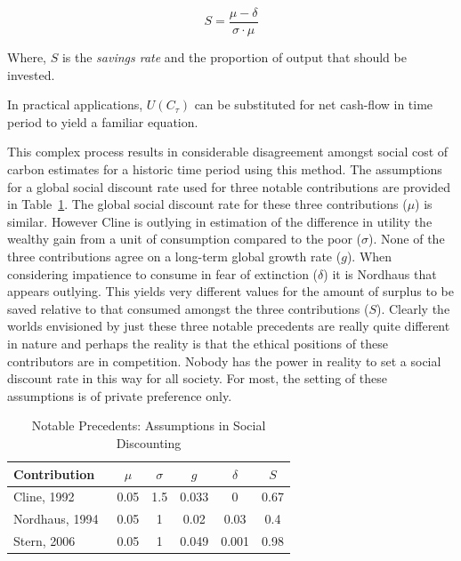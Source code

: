 \documentclass[11pt, oneside]{book}   	%
\begin{document}
\begin{equation}
S = \frac{\mu-\delta}{\sigma \cdot \mu}
\end{equation}

Where, $S$ is the \emph{savings rate} and the proportion of output that should be invested.\par

In practical applications, $U (C_\tau)$ can be substituted for net cash-flow in time period to yield a familiar equation.\par

This complex process results in considerable disagreement amongst social cost of carbon estimates for a historic time period using this method.
The assumptions for a global social discount rate used for three notable contributions are provided in Table~\ref{Social contributions table}.
The global social discount rate for these three contributions ($\mu$) is similar. However Cline is outlying in estimation of the difference in utility the wealthy gain from a unit of consumption compared to the poor ($\sigma$). None of the three contributions agree on a long-term global growth rate ($g$). When considering impatience to consume in fear of extinction ($\delta$) it is Nordhaus that appears outlying. This yields very different values for the amount of surplus to be saved relative to that consumed amongst the three contributions ($S$). Clearly the worlds envisioned by just these three notable precedents are really quite different in nature and perhaps the reality is that the ethical positions of these contributors are in competition. Nobody has the power in reality to set a social discount rate in this way for all society. For most, the setting of these assumptions is of private preference only.

\begin{table}[H]
\caption{Notable Precedents: Assumptions in Social Discounting}
\begin{center}
\begin{tabular}{| l | c | c | c | c | c |}
\hline
Contribution&$\mu$&$\sigma$&$g$&$\delta$&$S$\\
\hline
Cline, 1992~\cite{wc1}&0.05&1.5&0.033&0&0.67 \\
Nordhaus, 1994~\cite{wn1}&0.05&1&0.02&0.03&0.4 \\
Stern, 2006~\cite{ns1}&0.05&1&0.049&0.001&0.98 \\
\hline
\end{tabular}
\end{center}
\label{Social contributions table}
\end{table}
\end{document}
